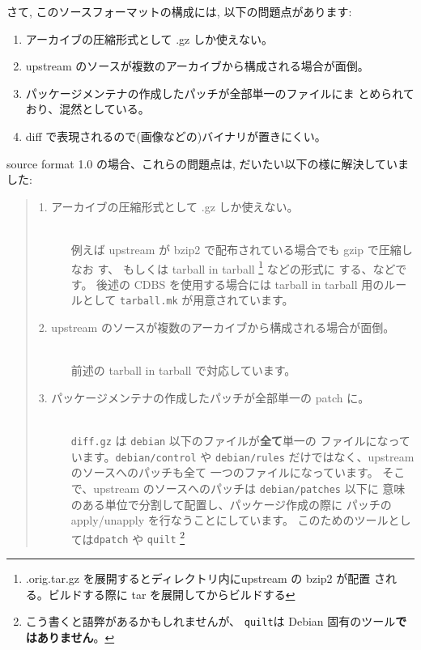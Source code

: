 \documentclass[mingoth,a4paper]{jsarticle}
\begin{document}
さて, このソースフォーマットの構成には, 以下の問題点があります:
\begin{enumerate}
      \item アーカイブの圧縮形式として .gz  しか使えない。
      \item upstream のソースが複数のアーカイブから構成される場合が面倒。
      \item パッケージメンテナの作成したパッチが全部単一のファイルにま
    とめられており、混然としている。
      \item diff で表現されるので(画像などの)バイナリが置きにくい。
\end{enumerate}

source format 1.0 の場合、これらの問題点は, だいたい以下の様に解決していました:
\begin{quote}
    \begin{description}
          \item[1. アーカイブの圧縮形式として .gz しか使えない。] 　\\
        例えば upstream が bzip2 で配布されている場合でも gzip で圧縮しなお
        す、 もしくは tarball in tarball \footnote{%
          .orig.tar.gz を展開するとディレクトリ内にupstream の bzip2 が配置
          される。ビルドする際に tar を展開してからビルドする} などの形式に
        する、などです。
        後述の CDBS を使用する場合には tarball in tarball 用のルールとして
        {\tt tarball.mk} が用意されています。
           \item[%
        2. upstream のソースが複数のアーカイブから構成される場合が面倒。]　\\
        前述の tarball in tarball で対応しています。
          \item[3. パッケージメンテナの作成したパッチが全部単一の patch に。]
        　\\
        {\tt diff.gz} は {\tt debian} 以下のファイルが{\bf 全て}単一の
        ファイルになっています。{\tt debian/control} や 
        {\tt debian/rules} だけではなく、upstream のソースへのパッチも全て
        一つのファイルになっています。
        そこで、upstream のソースへのパッチは {\tt debian/patches} 以下に
        意味のある単位で分割して配置し、パッケージ作成の際に
        パッチの apply/unapply を行なうことにしています。
        このためのツールとしては{\tt dpatch} や
        {\tt quilt}
        \footnote{%
          こう書くと語弊があるかもしれませんが、
          {\tt quilt}は Debian 固有のツール{\bf ではありません}。
}
\end{description}
\end{quote}
\end{document}
